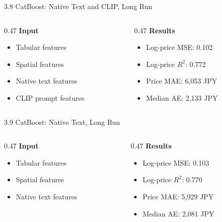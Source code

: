 \documentclass[aspectratio=169,11pt]{beamer}
\begin{document}
\begin{frame}{3.8 CatBoost: Native Text and CLIP, Long Run}
  \begin{columns}[T,onlytextwidth]
    \begin{column}{0.47\textwidth}
      \textbf{Input}
      \begin{itemize}
        \item Tabular features
        \item Spatial features
        \item Native text features
        \item CLIP prompt features
      \end{itemize}
    \end{column}
    \begin{column}{0.47\textwidth}
      \textbf{Results}
      \begin{itemize}
        \item Log-price MSE: 0.102
        \item Log-price $R^2$: 0.772
        \item Price MAE: 6,053 JPY
        \item Median AE: 2,133 JPY
      \end{itemize}
    \end{column}
  \end{columns}
\end{frame}

\begin{frame}{3.9 CatBoost: Native Text, Long Run}
  \begin{columns}[T,onlytextwidth]
    \begin{column}{0.47\textwidth}
      \textbf{Input}
      \begin{itemize}
        \item Tabular features
        \item Spatial features
        \item Native text features
      \end{itemize}
    \end{column}
    \begin{column}{0.47\textwidth}
      \textbf{Results}
      \begin{itemize}
        \item Log-price MSE: 0.103
        \item Log-price $R^2$: 0.770
        \item Price MAE: 5,929 JPY
        \item Median AE: 2,081 JPY
      \end{itemize}
    \end{column}
  \end{columns}
\end{frame}
\end{document}

